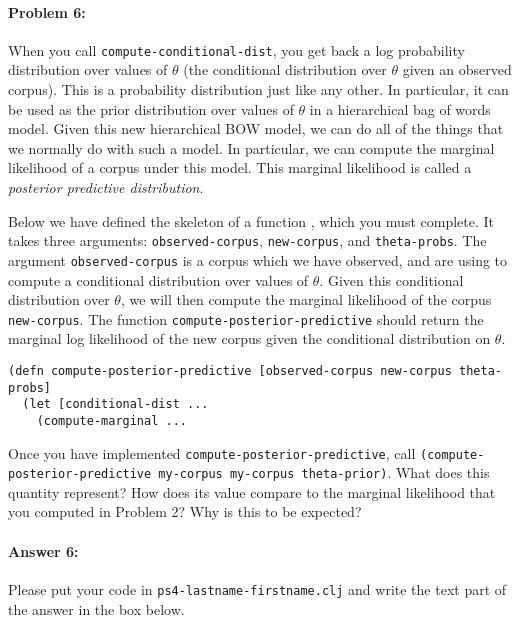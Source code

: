 \documentclass[10pt]{article}
\newcommand{\required}[1]{{\color{blue}{#1}}}
\newcommand{\PSnum}{4}
\begin{document}
\hrulefill %

\paragraph{Problem 6:}
When you call \texttt{compute-conditional-dist}, you get back a log
probability distribution over values of $\theta$ (the conditional
distribution over $\theta$ given an observed corpus). This is a
probability distribution just like any other. In particular, it can be
used as the prior distribution over values of $\theta$ in a
hierarchical bag of words model. Given this new hierarchical BOW
model, we can do all of the things that we normally do with such a
model. In particular, we can compute the marginal likelihood of a
corpus under this model. This marginal likelihood is called a
\emph{posterior predictive distribution}.

 Below we have defined the skeleton of a function
\required{\texttt{compute-posterior-predictive}}, which you must
complete. It takes three arguments: \texttt{observed-corpus},
\texttt{new-corpus}, and \texttt{theta-probs}. The argument
\texttt{observed-corpus} is a corpus which we have observed, and are
using to compute a conditional distribution over values of $\theta$.
Given this conditional distribution over $\theta$, we will then
compute the marginal likelihood of the corpus \texttt{new-corpus}. The
function \texttt{compute-posterior-predictive} should return the
marginal log likelihood of the new corpus given the conditional
distribution on $\theta$.

\begin{lstlisting}
(defn compute-posterior-predictive [observed-corpus new-corpus theta-probs]
  (let [conditional-dist ...
    (compute-marginal ...
\end{lstlisting}

 Once you have implemented
\texttt{compute-posterior-predictive}, call
\texttt{(compute-posterior-predictive my-corpus my-corpus
theta-prior)}. What does this quantity represent? How does its value
compare to the marginal likelihood that you computed in Problem 2? Why
is this to be expected?

\paragraph{Answer 6:} Please put your code in
\texttt{ps\PSnum-lastname-firstname.clj} and write the text part of
the answer in the box below.
\end{document}
